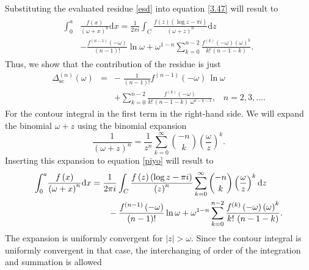 Substituting the evaluated residue \eqref{esd} into equation \eqref{3.47} will result to
\begin{align}
\begin{split} \label{piyo}
	\int_{0}^{a} & \frac{f\left(x\right)}{\left(\omega+x\right)^n}\mathrm{d}x
	=\frac{1}{2\pi i}\int_{C}\frac{f\left(z\right)\left(\log z-\pi i\right)}{\left(\omega+z\right)^n}\mathrm{d}z \\& -\frac{f^{\left(n-1\right)}\left(-\omega\right)}{\left(n-1\right)!}\ln\omega
	+\omega^{1-n}\sum_{k=0}^{n-2}\frac{f^{\left(k\right)}\left(-\omega\right)\left(\omega\right)^{k}}{k!\,\left(n-1-k\right)}.
\end{split}
\end{align}
 Thus, we show that the contribution of the residue is just 
 \begin{eqnarray} \label{Res}
 \Delta_{\mathrm{sc}}^{(n)}(\omega)&=&-\;\frac{1}{\left(n-1\right)!}f^{(n-1)}\!\left(-\omega\right)\, \ln\omega \nonumber \\
 && + \sum_{k=0}^{n-2}\frac{f^{\left(k\right)}\left(-\omega\right)}{k!\,\left(n-1-k\right) \; \omega^{n-k-1}}, \;\;\; n=2, 3, \dots.
 \end{eqnarray}
For the contour integral in the first term in the right-hand side. We will expand the binomial $\omega + z$ using the binomial expansion
\begin{equation}
	\frac{1}{\left(\omega+z\right)^{n}}=\frac{1}{z^n}\sum_{k=0}^{\infty}{{-n}\choose k}\left(\frac{\omega}{z}\right)^{k}.
\end{equation}
Inserting this expansion to equation \eqref{piyo} will result to
\begin{align}
\begin{split}
	\int_{0}^{a} & \frac{f\left(x\right)}{\left(\omega+x\right)^n}\mathrm{d}x = \frac{1}{2\pi i}\int_{C}\frac{f\left(z\right)\left(\log z-\pi i\right)}{\left(z\right)^n}\sum_{k=0}^{\infty}{{-n}\choose k}\left(\frac{\omega}{z}\right)^{k}\mathrm{d}z
	\\& \hspace{25mm}-\frac{f^{\left(n-1\right)}\left(-\omega\right)}{\left(n-1\right)!}\ln\omega
	+\omega^{1-n}\sum_{k=0}^{n-2}\frac{f^{\left(k\right)}\left(-\omega\right)\left(\omega\right)^{k}}{k!\,\left(n-1-k\right)}.
\end{split}
\end{align}
The expansion is uniformly convergent for $|z| > \omega$. Since the contour integral is uniformly convergent in that case, the interchanging of order of the integration and summation is allowed
